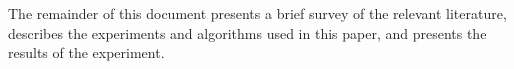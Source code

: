 The remainder of this document presents a brief survey of the relevant literature, describes the experiments and algorithms used in this paper, and presents the results of the experiment.  






% 	
% 	
% 	
% 
